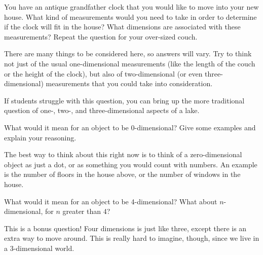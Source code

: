\documentclass[nooutcomes,noauthor, handout]{ximera}
\begin{document}
\begin{problem}
You have an antique grandfather clock that you would like to move into your new house.  What kind of measurements would you need to take in order to determine if the clock will fit in the house?  What dimensions are associated with these measurements?  Repeat the question for your over-sized couch.

\begin{solution}
There are many things to be considered here, so answers will vary.  Try to think not just of the usual one-dimensional measurements (like the length of the couch or the height of the clock), but also of two-dimensional (or even three-dimensional) measurements that you could take into consideration.

If students struggle with this question, you can bring up the more traditional question of one-, two-, and three-dimensional aspects of a lake.
\end{solution}

\end{problem}

\begin{problem}
    What would it mean for an object to be 0-dimensional?  Give some examples and explain your reasoning.
    
    \begin{solution}
        The best way to think about this right now is to think of a zero-dimensional object as just a dot, or as something you would count with numbers.  An example is the number of floors in the house above, or the number of windows in the house.
    \end{solution}
    

\end{problem}



\begin{problem}
    What would it mean for an object to be 4-dimensional?  What about $n$-dimensional, for $n$ greater than 4?
       \begin{solution}
        This is a bonus question!  Four dimensions is just like three, except there is an extra way to move around.  This is really hard to imagine, though, since we live in a 3-dimensional world.
    \end{solution}
 
\end{problem}
\end{document}

